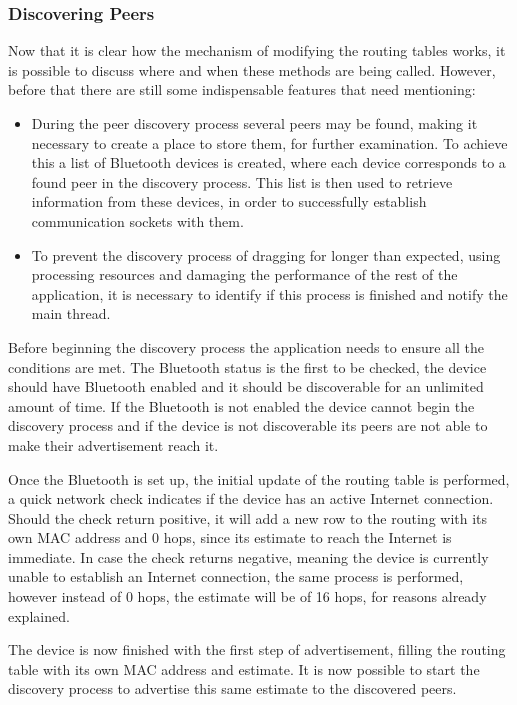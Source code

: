 \subsubsection{Discovering Peers}
\label{subsubsec:disc}

Now that it is clear how the mechanism of modifying the routing tables works, it is possible to discuss where and when these methods are being called. However, before that there are still some indispensable features that need mentioning:

\begin{itemize}
	\item During the peer discovery process several peers may be found, making it necessary to create a place to store them, for further examination. To achieve this a list of Bluetooth devices is created, where each device corresponds to a found peer in the discovery process. This list is then used to retrieve information from these devices, in order to successfully establish communication sockets with them.
	
	\item To prevent the discovery process of dragging for longer than expected, using processing resources and damaging the performance of the rest of the application, it is necessary to identify if this process is finished and notify the main thread.
\end{itemize}

Before beginning the discovery process the application needs to ensure all the conditions are met. The Bluetooth status is the first to be checked, the device should have Bluetooth enabled and it should be discoverable for an unlimited amount of time. If the Bluetooth is not enabled the device cannot begin the discovery process and if the device is not discoverable its peers are not able to make their advertisement reach it.

Once the Bluetooth is set up, the initial update of the routing table is performed, a quick network check indicates if the device has an active Internet connection. Should the check return positive, it will add a new row to the routing with its own \gls{MAC} address and 0 hops, since its estimate to reach the Internet is immediate. In case the check returns negative, meaning the device is currently unable to establish an Internet connection, the same process is performed, however instead of 0 hops, the estimate will be of 16 hops, for reasons already explained.

The device is now finished with the first step of advertisement, filling the routing table with its own \gls{MAC} address and estimate. It is now possible to start the discovery process to advertise this same estimate to the discovered peers.

